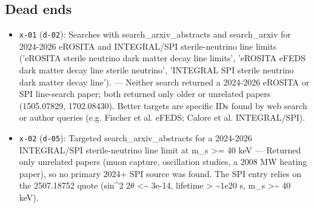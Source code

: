 \documentclass[11pt,a4paper]{article}
\begin{document}
\subsection{Dead ends}
\begin{itemize}
  \item \texttt{x-01} (\texttt{d-02}): Searches with search\_arxiv\_abstracts and search\_arxiv for 2024-2026 eROSITA and INTEGRAL/SPI sterile-neutrino line limits ('eROSITA sterile neutrino dark matter decay line limits', 'eROSITA eFEDS dark matter decay line sterile neutrino', 'INTEGRAL SPI sterile neutrino dark matter decay line'). --- Neither search returned a 2024-2026 eROSITA or SPI line-search paper; both returned only older or unrelated papers (1505.07829, 1702.08430). Better targets are specific IDs found by web search or author queries (e.g. Fischer et al. eFEDS; Calore et al. INTEGRAL/SPI).
  \item \texttt{x-02} (\texttt{d-05}): Targeted search\_arxiv\_abstracts for a 2024-2026 INTEGRAL/SPI sterile-neutrino line limit at m\_s \textgreater{}= 40 keV --- Returned only unrelated papers (muon capture, oscillation studies, a 2008 MW heating paper), so no primary 2024+ SPI source was found. The SPI entry relies on the 2507.18752 quote (sin\textasciicircum{}2 2$\theta$ \textless{}\textasciitilde{} 3e-14, lifetime \textgreater{} \textasciitilde{}1e20 s, m\_s \textgreater{}\textasciitilde{} 40 keV).
\end{itemize}
\end{document}
